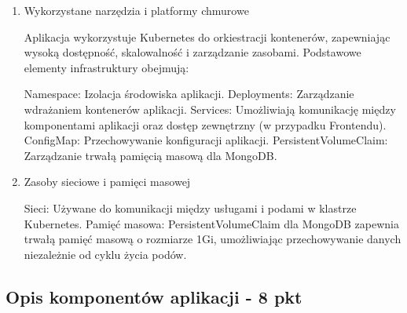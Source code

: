 \documentclass[12pt,a4paper]{article}
\begin{document}
\begin{enumerate}
\item Wykorzystane narzędzia i platformy chmurowe

Aplikacja wykorzystuje Kubernetes do orkiestracji kontenerów, zapewniając wysoką dostępność, skalowalność i zarządzanie zasobami. Podstawowe elementy infrastruktury obejmują:

    Namespace: Izolacja środowiska aplikacji. \newline
    Deployments: Zarządzanie wdrażaniem kontenerów aplikacji. \newline
    Services: Umożliwiają komunikację między komponentami aplikacji oraz dostęp zewnętrzny (w przypadku Frontendu). \newline
    ConfigMap: Przechowywanie konfiguracji aplikacji. \newline
    PersistentVolumeClaim: Zarządzanie trwałą pamięcią masową dla MongoDB.

\item Zasoby sieciowe i pamięci masowej

    Sieci: Używane do komunikacji między usługami i podami w klastrze Kubernetes.
    Pamięć masowa: PersistentVolumeClaim dla MongoDB zapewnia trwałą pamięć masową o rozmiarze 1Gi, umożliwiając przechowywanie danych niezależnie od cyklu życia podów.
\end{enumerate}
\subsection{Opis komponentów aplikacji - 8 pkt}
\label{sec:FunctionalConditions}
\end{document}
